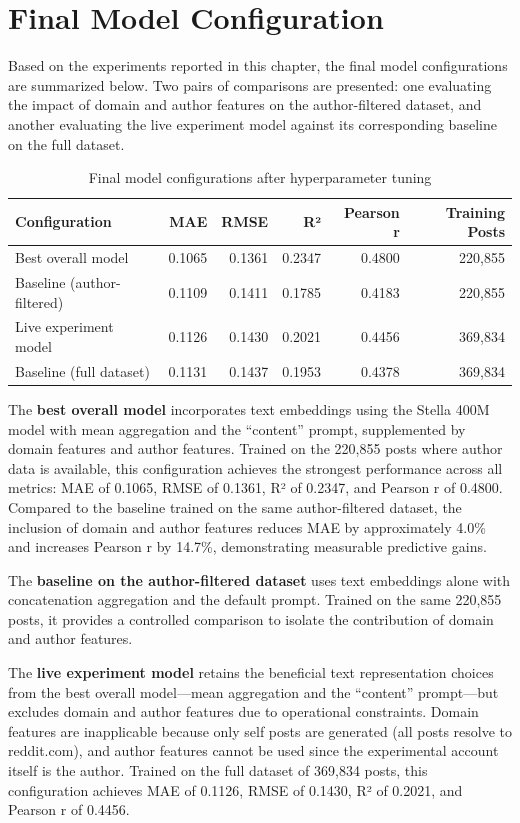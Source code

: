 \section{Final Model Configuration}

Based on the experiments reported in this chapter, the final model configurations are summarized below. Two pairs of comparisons are presented: one evaluating the impact of domain and author features on the author-filtered dataset, and another evaluating the live experiment model against its corresponding baseline on the full dataset.

\begin{table}[htbp]
\centering
\caption{Final model configurations after hyperparameter tuning}
\label{tab:final_model_configs}
\begin{tabular}{lrrrrr}
\toprule
Configuration & MAE & RMSE & R² & Pearson r & Training Posts \\
\midrule
Best overall model & 0.1065 & 0.1361 & 0.2347 & 0.4800 & 220,855 \\
Baseline (author-filtered) & 0.1109 & 0.1411 & 0.1785 & 0.4183 & 220,855 \\
\midrule
Live experiment model & 0.1126 & 0.1430 & 0.2021 & 0.4456 & 369,834 \\
Baseline (full dataset) & 0.1131 & 0.1437 & 0.1953 & 0.4378 & 369,834 \\
\bottomrule
\end{tabular}
\end{table}

The \textbf{best overall model} incorporates text embeddings using the Stella 400M model with mean aggregation and the ``content'' prompt, supplemented by domain features and author features. Trained on the 220,855 posts where author data is available, this configuration achieves the strongest performance across all metrics: MAE of 0.1065, RMSE of 0.1361, R² of 0.2347, and Pearson r of 0.4800. Compared to the baseline trained on the same author-filtered dataset, the inclusion of domain and author features reduces MAE by approximately 4.0\% and increases Pearson r by 14.7\%, demonstrating measurable predictive gains.

The \textbf{baseline on the author-filtered dataset} uses text embeddings alone with concatenation aggregation and the default prompt. Trained on the same 220,855 posts, it provides a controlled comparison to isolate the contribution of domain and author features.

The \textbf{live experiment model} retains the beneficial text representation choices from the best overall model---mean aggregation and the ``content'' prompt---but excludes domain and author features due to operational constraints. Domain features are inapplicable because only self posts are generated (all posts resolve to reddit.com), and author features cannot be used since the experimental account itself is the author. Trained on the full dataset of 369,834 posts, this configuration achieves MAE of 0.1126, RMSE of 0.1430, R² of 0.2021, and Pearson r of 0.4456.


